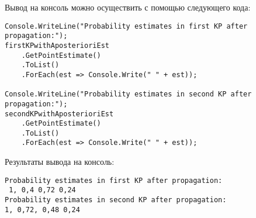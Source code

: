Вывод на консоль можно осуществить с помощью следующего кода:
\begin{lstlisting}[caption = Вывод результатов на консоль]
Console.WriteLine("Probability estimates in first KP after propagation:");
firstKPwithAposterioriEst
    .GetPointEstimate()
    .ToList()
    .ForEach(est => Console.Write(" " + est));
 
Console.WriteLine("Probability estimates in second KP after propagation:");
secondKPwithAposterioriEst
    .GetPointEstimate()
    .ToList()
    .ForEach(est => Console.Write(" " + est));
\end{lstlisting}

Результаты вывода на консоль:
\begin{lstlisting}[caption = Результаты]
Probability estimates in first KP after propagation:
 1, 0,4 0,72 0,24
Probability estimates in second KP after propagation:
1, 0,72, 0,48 0,24
\end{lstlisting}
